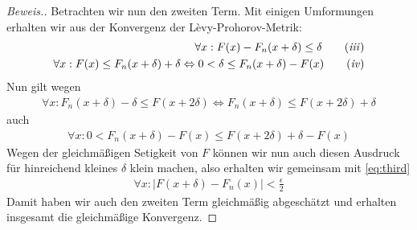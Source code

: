 \begin{proof}[Beweis.]
Betrachten wir nun den zweiten Term. Mit einigen Umformungen erhalten wir aus der Konvergenz der Lèvy-Prohorov-Metrik:
\begin{align*}
 \forall x: F(x) - F_n(x + \delta) \leq \delta \tag{\textit{iii}} \label{eq:third} \\
 \forall x: F(x)\leq F_n(x+\delta)+\delta\Leftrightarrow 0<\delta\leq F_n(x+\delta)-F(x)\tag{\textit{iv}} \label{eq:forth} \\
\end{align*}
Nun gilt wegen 
\begin{align*}
  \forall x: F_n(x+\delta)-\delta\leq F(x+2\delta)\Leftrightarrow F_n(x+\delta)\leq F(x+2\delta)+\delta
\end{align*}
auch
\begin{align*}
  \forall x: 0<F_n(x+\delta)-F(x)\leq F(x+2\delta)+\delta-F(x)
\end{align*}
Wegen der gleichmäßigen Setigkeit von $F$ können wir nun auch diesen Ausdruck für hinreichend kleines $\delta$ klein machen, also erhalten wir gemeinsam mit \ref{eq:third}
\begin{align*}
  \forall x:\vert F(x+\delta)-F_n(x)\vert<\frac{\epsilon}{2}
\end{align*}
Damit haben wir auch den zweiten Term gleichmäßig abgeschätzt und erhalten insgesamt die gleichmäßige Konvergenz.
\end{proof}
